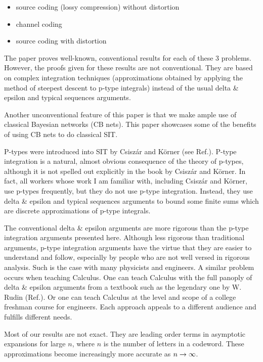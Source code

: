 \begin{itemize}
\item source coding (lossy compression)
without distortion
\item channel coding
\item source coding with distortion
\end{itemize}
The paper proves
well-known, conventional results for
each of these 3 problems. However,
the proofs given for these results
are not conventional. They
are based on complex integration techniques
(approximations obtained by applying
the method of steepest descent to
p-type integrals)
instead of the usual delta \& epsilon
and typical sequences
arguments.

Another
unconventional feature
of this paper
is that we make ample
use of classical Bayesian networks (CB nets).
This paper showcases
some of the benefits of using
CB nets to do classical SIT.


P-types were introduced into SIT
by Csisz\'{a}r and K\"{o}rner (see Ref.\cite{CK}).
P-type integration is
a natural, almost obvious
consequence of the theory of
p-types,
although it is not spelled out
explicitly in the book
by Csisz\'{a}r and K\"{o}rner.
In fact, all workers
whose work I am familiar
with, including Csisz\'{a}r and K\"{o}rner,
use p-types frequently, but
they do not use p-type integration.
Instead, they use delta \& epsilon
and typical sequences
arguments to bound some finite sums
which are discrete approximations
of p-type integrals.

The conventional delta \& epsilon arguments
are more rigorous than
the p-type integration arguments
presented here.
Although less rigorous
than traditional arguments,
p-type integration arguments
have the virtue that they are
easier to understand and follow,
especially
by people who are not well versed
in rigorous analysis.
Such is the case with many
physicists and engineers.
A similar problem occurs
when teaching Calculus.
One can teach
Calculus with the full panoply of
delta \& epsilon arguments
from a textbook such as the
legendary one by W. Rudin (Ref.\cite{Rudin}).
Or one can teach Calculus
at the level and scope of
 a college freshman  course
for engineers.
Each approach appeals to
a different audience and fulfills different
needs.

Most of our results are not
exact. They are
leading order terms
in asymptotic expansions
for large $n$,
where $n$ is the number of letters
in a codeword. These
approximations become increasingly
more accurate as $n\rightarrow \infty$.


